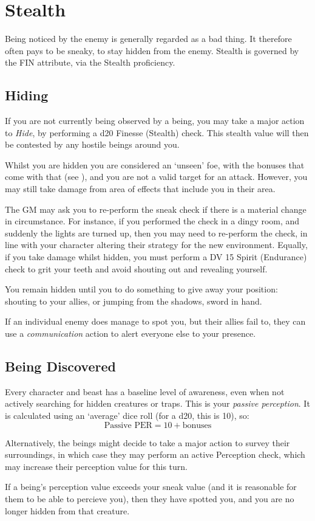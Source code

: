 \section{Stealth} \label{S:Stealth}

Being noticed by the enemy is generally regarded as a bad thing. It therefore often pays to be sneaky, to stay hidden from the enemy. Stealth is governed by the FIN attribute, via the Stealth proficiency. 

\subsection{Hiding}

If you are not currently being observed by a being, you may take a major action to {\it Hide}, by performing a d20 Finesse (Stealth) check. This stealth value will then be contested by any hostile beings around you. 

Whilst you are hidden you are considered an `unseen' foe, with the bonuses that come with that (see \pageref{S:Unseen}), and you are not a valid target for an attack. However, you may still take damage from area of effects that include you in their area. 

The GM may ask you to re-perform the sneak check if there is a material change in circumstance. For instance, if you performed the check in a dingy room, and suddenly the lights are turned up, then you may need to re-perform the check, in line with your character altering their strategy for the new environment. Equally, if you take damage whilst hidden, you must perform a DV 15 Spirit (Endurance) check to grit your teeth and avoid shouting out and revealing yourself. 

You remain hidden until you to do something to give away your position: shouting to your allies, or jumping from the shadows, sword in hand. 

If an individual enemy does manage to spot you, but their allies fail to, they can use a {\it communication} action to alert everyone else to your presence. 


\subsection{Being Discovered}

Every character and beast has a baseline level of awareness, even when not actively searching for hidden creatures or traps. This is your {\it passive perception}. It is calculated using an `average' dice roll (for a d20, this is 10), so: 
$$\text{Passive PER} = 10 + \text{bonuses}$$

Alternatively, the beings might decide to take a major action to survey their surroundings, in which case they may perform an active Perception check, which may increase their perception value for this turn. 

If a being's perception value exceeds your sneak value (and it is reasonable for them to be able to percieve you), then they have spotted you, and you are no longer hidden from that creature.  




